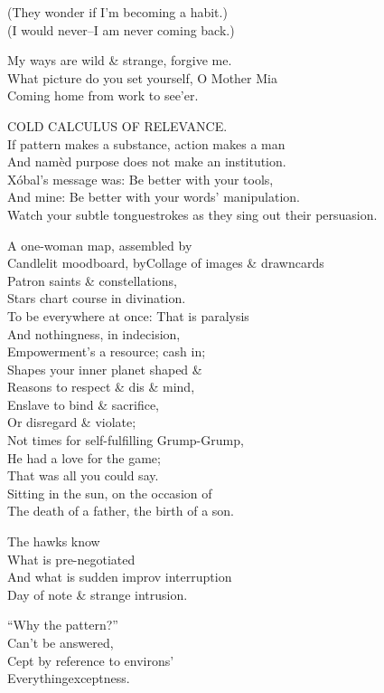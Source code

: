 (They wonder if I'm becoming a habit.) \\
(I would never--I am never coming back.)

My ways are wild \& strange, forgive me. \\
What picture do you set yourself, O Mother Mia \\
Coming home from work to see'er.

COLD CALCULUS OF RELEVANCE. \\
If pattern makes a substance, action makes a man \\
And namèd purpose does not make an institution. \\
Xóbal's message was: Be better with your tools, \\
And mine: Be better with your words' manipulation. \\
Watch your subtle tonguestrokes as they sing out their persuasion.

A one-woman map, assembled by \\
Candlelit moodboard, byCollage of images \& drawncards \\
Patron saints \& constellations, \\
Stars chart course in divination. \\
To be everywhere at once: That is paralysis \\
And nothingness, in indecision, \\
Empowerment's a resource; cash in; \\
Shapes your inner planet shaped \& \\
Reasons to respect \& dis \& mind, \\
Enslave to bind \& sacrifice, \\
Or disregard \& violate; \\
Not times for self-fulfilling Grump-Grump, \\
He had a love for the game; \\
That was all you could say. \\
Sitting in the sun, on the occasion of \\
The death of a father, the birth of a son.

The hawks know \\
What is pre-negotiated \\
And what is sudden improv interruption \\ 
Day of note \& strange intrusion.

``Why the pattern?'' \\
Can't be answered, \\
Cept by reference to environs' \\
Everythingexceptness.


